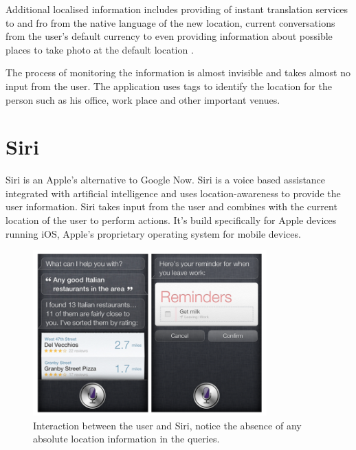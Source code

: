 \documentclass[12pt]{report}
\begin{document}
Additional localised information includes providing of instant translation services to and fro from the native language of the new location, current conversations from the user's default currency to even providing information about possible places to take photo at the default location \cite{google2014app}.
 
The process of monitoring the information is almost invisible and takes almost no input from the user. The application uses tags to identify the location for the person such as his office, work place and other important venues.

\section{Siri}

Siri\cite{siri2014} is an Apple's alternative to Google Now. Siri is a voice based assistance integrated with artificial intelligence and uses location-awareness to provide the user information. Siri takes input from the user and combines with the current location of the user to perform actions. It's build specifically for Apple devices running iOS, Apple's proprietary operating system for mobile devices.

\begin{figure}[htbp]
 \centering
 \includegraphics[width=90mm]{Siri.png}
  \caption[Interaction between the user and Siri.]{Interaction between the user and Siri, notice the absence of any absolute location information in the queries.}
 \label{figure:Siri}
\end{figure}
\end{document}
